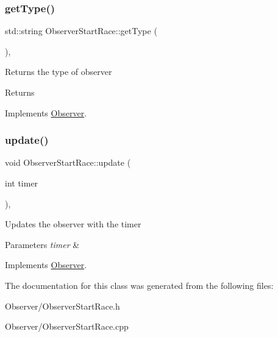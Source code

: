 \subsubsection{\texorpdfstring{get\+Type()}{getType()}}
{\footnotesize\ttfamily std\+::string Observer\+Start\+Race\+::get\+Type (\begin{DoxyParamCaption}{ }\end{DoxyParamCaption})\hspace{0.3cm}{\ttfamily [override]}, {\ttfamily [virtual]}}

Returns the type of observer \begin{DoxyReturn}{Returns}

\end{DoxyReturn}


Implements \hyperlink{classObserver_a92f704d0a3e6e0ade2743da2ae91bcb7}{Observer}.

\mbox{\label{classObserverStartRace_aa810164d0877c5597ec06adab29b7981}} 
\subsubsection{\texorpdfstring{update()}{update()}}
{\footnotesize\ttfamily void Observer\+Start\+Race\+::update (\begin{DoxyParamCaption}\item[{int}]{timer }\end{DoxyParamCaption})\hspace{0.3cm}{\ttfamily [override]}, {\ttfamily [virtual]}}

Updates the observer with the timer 
\begin{DoxyParams}{Parameters}
{\em timer} & \\
\hline
\end{DoxyParams}


Implements \hyperlink{classObserver_a4b9e6fbc74e7ae6971b2afe462ab5a87}{Observer}.



The documentation for this class was generated from the following files\+:\begin{DoxyCompactItemize}
\item 
Observer/Observer\+Start\+Race.\+h\item 
Observer/Observer\+Start\+Race.\+cpp\end{DoxyCompactItemize}
